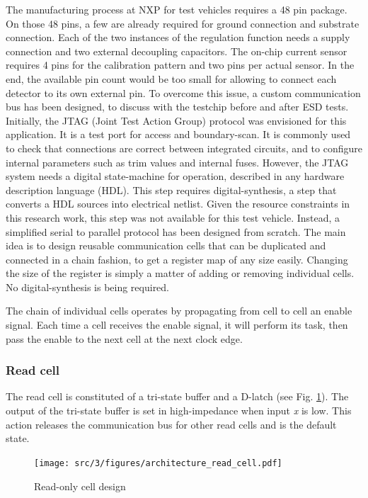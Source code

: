The manufacturing process at NXP for test vehicles requires a 48 pin package.
On those 48 pins, a few are already required for ground connection and substrate connection.
Each of the two instances of the regulation function needs a supply connection and two external decoupling capacitors.
The on-chip current sensor requires 4 pins for the calibration pattern and two pins per actual sensor.
In the end, the available pin count would be too small for allowing to connect each detector to its own external pin.
To overcome this issue, a custom communication bus has been designed, to discuss with the testchip before and after ESD tests.
Initially, the JTAG (Joint Test Action Group) \cite{jtag} protocol was envisioned for this application.
It is a test port for access and boundary-scan.
It is commonly used to check that connections are correct between integrated circuits, and to configure internal parameters such as trim values and internal fuses.
However, the JTAG system needs a digital state-machine for operation, described in any hardware description language (HDL).
This step requires digital-synthesis, a step that converts a HDL sources into electrical netlist.
Given the resource constraints in this research work, this step was not available for this test vehicle.
Instead, a simplified serial to parallel protocol has been designed from scratch.
The main idea is to design reusable communication cells that can be duplicated and connected in a chain fashion, to get a register map of any size easily.
Changing the size of the register is simply a matter of adding or removing individual cells.
No digital-synthesis is being required.

The chain of individual cells operates by propagating from cell to cell an enable signal.
Each time a cell receives the enable signal, it will perform its task, then pass the enable to the next cell at the next clock edge.

\subsubsection{Read cell}

The read cell is constituted of a tri-state buffer and a D-latch (see Fig. \ref{fig:read-cell-design}).
The output of the tri-state buffer is set in high-impedance when input \textit{x} is low.
This action releases the communication bus for other read cells and is the default state.

\begin{figure}[!h]
  \centering
  \texttt{[image: src/3/figures/architecture\_read\_cell.pdf]}
  \caption{Read-only cell design}
  \label{fig:read-cell-design}
\end{figure}

